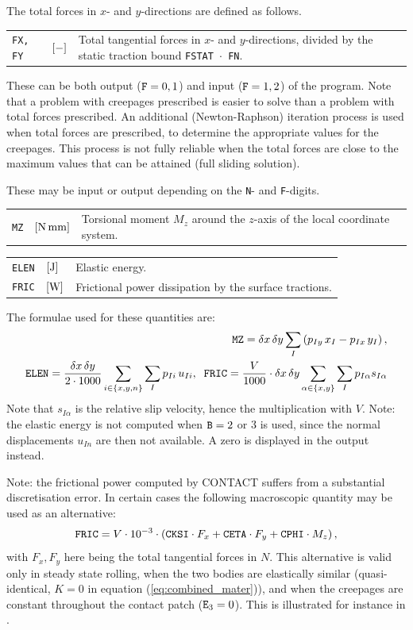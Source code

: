 \documentclass[12pt]{report}
\newenvironment{inputvars}{\vspace{0.4\baselineskip}%

\begin{tabular}{>{\raggedright}p{22mm}p{19mm}p{113mm}}}{
\end{tabular}

}
\newcommand{\inpvar}[3]{{\small\tt #1} & $#2$ & #3 \\[1ex]}
\newcommand{\inpbreak}{\end{inputvars}\begin{inputvars}}
\begin{document}
The total forces in $x$- and $y$-directions are defined as follows.
\begin{inputvars}
\inpvar{FX, FY}{\bunit{-}}{Total tangential forces in $x$- and $y$-directions,
        divided by the static traction bound {\tt FSTAT $\cdot$ FN}.}
\end{inputvars}
These can be both output (${\tt F}=0,1$) and input (${\tt F}=1,2$) of the
program. Note that a problem with creepages prescribed is easier to solve
than a problem with total forces prescribed. An additional (Newton-Raphson)
iteration process is used when total forces are prescribed, to determine
the appropriate values for the creepages. This process is not fully
reliable when the total forces are close to the maximum values that can be
attained (full sliding solution).

These may be input or output depending on the {\tt N}-
and {\tt F}-digits.
\begin{inputvars}
\inpvar{MZ}{\bunit{N\,mm}}{Torsional moment $M_z$ around the $z$-axis of
        the local coordinate system.}
\inpbreak
\inpvar{ELEN}{\bunit{J}}{Elastic energy.}
\inpvar{FRIC}{\bunit{W}}{Frictional power dissipation by the surface tractions.}
\end{inputvars}
The formulae used for these quantities are:
\begin{eqnarray}
  {\tt MZ} = \delta x\,\delta y
                        \sum_I \left( p_{Iy} \,x_I - p_{Ix}\, y_I\right), \\
  {\tt ELEN} = \frac{\delta x\,\delta y}{2\cdot 1000}  \sum_{i\in\{x,y,n\}}
                        \sum_{I} p_{Ii} \, u_{Ii}, \;\;
  {\tt FRIC} = \frac{V}{1000} \cdot \delta x\,\delta y
                        \sum_{\alpha\in\{x,y\}} \sum_{I} p_{I\alpha}
                        s_{I\alpha}
\end{eqnarray}
Note that $s_{I\alpha}$ is the relative slip velocity, hence the
multiplication with $V$.
Note: the elastic energy is not computed when ${\tt B}=2$ or 3 is used, since
the normal displacements $u_{In}$ are then not available. A zero is
displayed in the output instead.

Note: the frictional power computed by CONTACT suffers from a substantial
discretisation error. In certain cases the following macroscopic quantity
may be used as an alternative:
\begin{equation}
  {\tt FRIC} = V\cdot 10^{-3} \cdot \left( {\tt CKSI}\cdot F_x + 
                {\tt CETA}\cdot F_y + {\tt CPHI}\cdot M_z \right),
\end{equation}
with $F_x, F_y$ here being the total tangential forces in $\unit{N}$.
This alternative is valid only in steady state rolling, when the two
bodies are elastically similar (quasi-identical, $K=0$ in equation
(\ref{eq:combined_mater})), and when the creepages are constant throughout
the contact patch (${\tt E}_3=0$). This is illustrated for instance in
\cite{Munisamy1991}.
\end{document}
